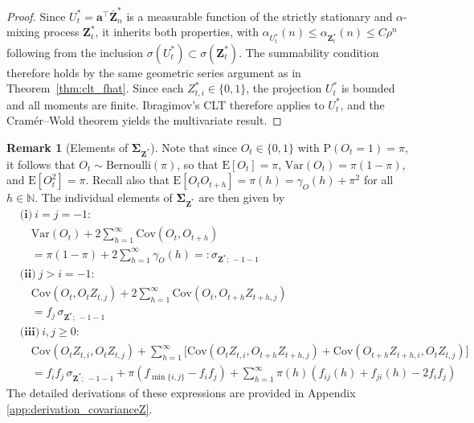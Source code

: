 ﻿\documentclass[12pt,a4paper]{scrreprt}
\theoremstyle{definition}
\newtheorem{remark}[theorem]{Remark}
\begin{document}
\begin{proof}
Since $U_t^* = \boldsymbol{a}^\top \bar{\boldsymbol{Z}}_n^*$ is a measurable function 
of the strictly stationary and $\alpha$-mixing process $\boldsymbol{Z}_t^*$, it 
inherits both properties, with $\alpha_{U_t^*}(n) \leq \alpha_{\boldsymbol{Z}_t^*}(n) 
\leq C\rho^n$ following from the inclusion $\sigma(U_t^*) \subset \sigma(\boldsymbol{Z}_t^*)$. 
The summability condition therefore holds by the same geometric series argument as 
in Theorem~\ref{thm:clt_fhat}. Since each $Z_{t,i}^* \in \{0,1\}$, the projection $U_t^*$ 
is bounded and all moments are finite. Ibragimov's CLT \citep[Theorem~7]{Ibragimov1962} 
therefore applies to $U_t^*$, and the Cramér--Wold theorem 
\citep[Corollary~4.5]{kallenberg_2021} yields the multivariate result.
\end{proof}
\begin{remark}[Elements of $\boldsymbol{\Sigma}_{\boldsymbol{Z}^*}$]
\label{rem:sigma_zstar}
\noindent Note that since $O_t \in \{0,1\}$ with $\mathrm{P}(O_t = 1) = \pi$, 
it follows that $O_t \sim \mathrm{Bernoulli}(\pi)$, so that $\mathrm{E}[O_t] = \pi$, 
$\mathrm{Var}(O_t) = \pi(1-\pi)$, and $\mathrm{E}[O_t^2] = \pi$. Recall also 
that $\mathrm{E}[O_t O_{t+h}] = \pi(h) = \gamma_O(h) + \pi^2$ for all 
$h \in \mathbb{N}$. The individual elements of $\boldsymbol{\Sigma}_{\boldsymbol{Z}^*}$ 
are then given by  \label{cal:Sigma_Z}
\begin{align*}
    &\textbf{(i)}\ i = j = -1: \\
    &\quad \mathrm{Var}(O_t) + 2\sum_{h=1}^\infty \mathrm{Cov}(O_t, O_{t+h}) \\
    &\quad= \pi(1-\pi) + 2\sum_{h=1}^{\infty}\gamma_O(h) =: \sigma_{\boldsymbol{Z}^*;\,-1-1} \\[2ex]
    &\textbf{(ii)}\ j > i = -1: \\
    &\quad \mathrm{Cov}(O_t, O_t Z_{t,j}) 
    + 2\sum_{h=1}^\infty \mathrm{Cov}(O_t, O_{t+h}Z_{t+h,j}) \\
    &\quad = f_j\,\sigma_{\boldsymbol{Z}^*;\,-1-1} \\[2ex]
    &\textbf{(iii)}\ i,j \geq 0: \\
    &\quad \mathrm{Cov}(O_t Z_{t,i}, O_tZ_{t,j}) 
    + \sum_{h=1}^{\infty}\bigl[\mathrm{Cov}(O_t Z_{t,i}, O_{t+h}Z_{t+h,j}) 
    + \mathrm{Cov}(O_{t+h}Z_{t+h, i}, O_t Z_{t,j})\bigr] \\
    &\quad = f_i f_j\,\sigma_{\boldsymbol{Z}^*;\,-1-1} 
    + \pi(f_{\min \{i,j\}} - f_i f_j)  
    + \sum_{h=1}^{\infty} \pi(h)(f_{ij}(h) + f_{ji}(h) - 2f_i f_j)
\end{align*}\noindent
The detailed derivations of these expressions are provided in Appendix \ref{app:derivation_covarianceZ}.
\end{remark}
\end{document}
